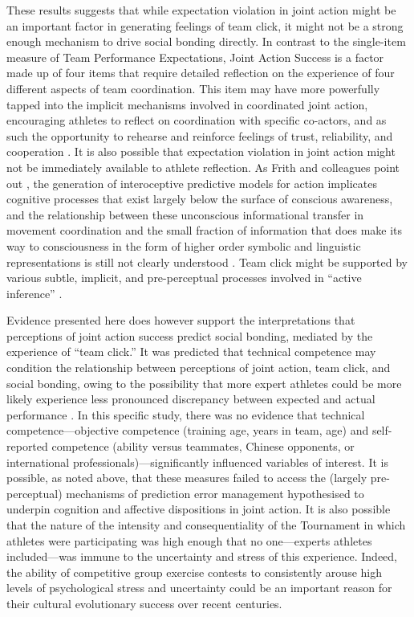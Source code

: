 \begin{landscape}
  These results suggests that while expectation violation in joint action might be an important factor in generating feelings of team click, it might not be a strong enough mechanism to drive social bonding directly.  In contrast to the single-item measure of Team Performance Expectations, Joint Action Success is a factor made up of four items that require detailed reflection on the experience of four different aspects of team coordination.  This item may have more powerfully tapped into the implicit mechanisms involved in coordinated joint action, encouraging athletes to reflect on coordination with specific co-actors, and as such the opportunity to rehearse and reinforce feelings of trust, reliability, and cooperation \citep{Reddish2013a}.  It is also possible that expectation violation in joint action might not be immediately available to athlete reflection.
  As Frith and colleagues point out \textcite{Frith2007,Frith2010,Clark2013}, the generation of interoceptive predictive models for action implicates cognitive processes that exist largely below the surface of conscious awareness, and the relationship between these unconscious informational transfer in movement coordination and the small fraction of information that does make its way to consciousness in the form of higher order symbolic and linguistic representations is still not clearly understood \citep{Semin2008}. Team click might be supported by various subtle, implicit, and pre-perceptual processes involved in ``active inference'' \citep{Schmidt2011}.

  Evidence presented here does however support the interpretations that perceptions of joint action success predict social bonding, mediated by the experience of ``team click.'' It was predicted that technical competence may condition the relationship between perceptions of joint action, team click, and social bonding, owing to the possibility that more expert athletes could be more likely experience less pronounced discrepancy between expected and actual performance \cite{Tomeo2012}.  In this specific study, there was no evidence that technical competence---objective competence (training age, years in team, age) and self-reported competence (ability versus teammates, Chinese opponents, or international professionals)---significantly influenced variables of interest.  It is possible, as noted above, that these measures failed to access the (largely pre-perceptual) mechanisms of prediction error management hypothesised to underpin cognition and affective dispositions in joint action.  It is also possible that the nature of the intensity and consequentiality of the Tournament in which athletes were participating was high enough that no one---experts athletes included---was immune to the uncertainty and stress of this experience. Indeed, the ability of competitive group exercise contests to consistently arouse high levels of psychological stress and uncertainty could be an important reason for their cultural evolutionary success over recent centuries.


\end{landscape}
